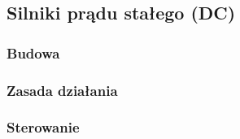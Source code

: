 \subsection{Silniki prądu stałego (DC)}

\subsubsection{Budowa}

\subsubsection{Zasada działania}

\subsubsection{Sterowanie}

\clearpage

